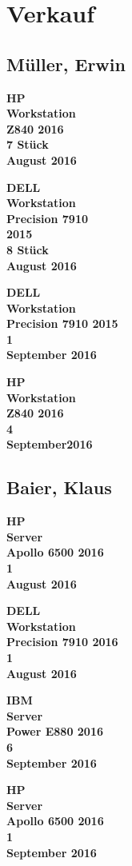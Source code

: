 \documentclass[a6paper, 12pt, grid=both, print]{kartei}
\begin{document}
\setcardpagelayout
\wedn
\section*{Verkauf}
\subsection*{Müller, Erwin}

\begin{karte}{\textbf{HP\\Workstation\\Z840 2016\\7 Stück\\ August 2016}}
\end{karte}

\begin{karte}{\textbf{DELL\\Workstation\\Precision 7910\\2015\\ 8 Stück\\ August 2016}}
\end{karte}

\begin{karte}{\textbf{DELL\\Workstation\\Precision 7910 2015\\ 1\\September 2016}}
\end{karte}

\begin{karte}{\textbf{HP\\Workstation\\Z840 2016\\ 4\\September2016}}
\end{karte}


\subsection*{Baier, Klaus}
\calligra

\begin{karte}{\textbf{HP\\Server\\Apollo 6500 2016\\ 1\\August 2016}}
\end{karte}


\begin{karte}{\textbf{DELL\\Workstation\\Precision 7910 2016\\ 1\\August 2016}}
\end{karte}


\begin{karte}{\textbf{IBM\\Server\\Power E880 2016\\ 6\\September 2016}}
\end{karte}

\begin{karte}{\textbf{HP\\Server\\Apollo 6500 2016\\ 1\\September 2016}}
\end{karte}
\end{document}
